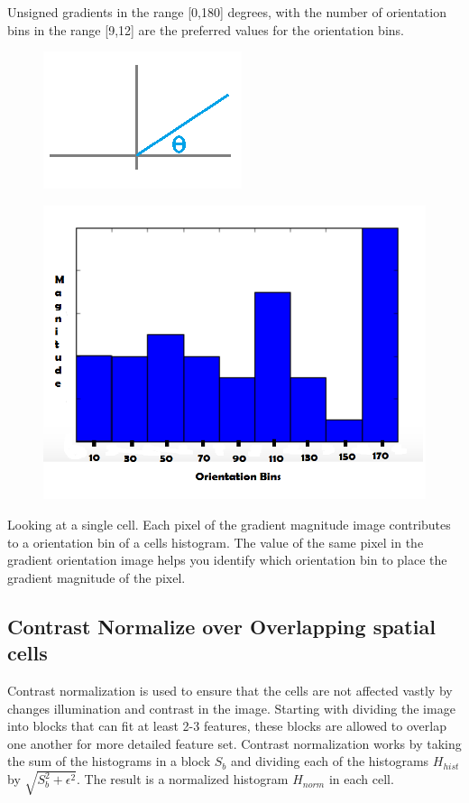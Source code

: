 Unsigned gradients in the range [0,180] degrees, with the number of orientation bins in the range [9,12] are the preferred values for the orientation bins.
\begin{figure}[H]
\centering
\begin{minipage}{.5\textwidth}
  \centering
  \includegraphics[width=.4\linewidth]{theta}
  \label{fig:test1}
\end{minipage}%
\begin{minipage}{.5\textwidth}
  \centering
  \includegraphics[width=.4\linewidth]{hist}
  \label{fig:test2}
\end{minipage}
\end{figure}
Looking at a single cell. Each pixel of the gradient magnitude image contributes to a orientation bin of a cells histogram. The value of the same pixel in the gradient orientation image helps you identify which orientation bin to place the gradient magnitude of the pixel.

\subsection{Contrast Normalize over Overlapping spatial cells}
Contrast normalization is used to ensure that the cells are not affected vastly by changes illumination and contrast in the image. Starting with dividing the image into blocks that can fit at least 2-3 features, these blocks are allowed to overlap one another for more detailed feature set. Contrast normalization works by taking the sum of the histograms in a block $S_b$ and dividing each of the histograms $H_{hist}$ by $\sqrt{S_b ^2 + \epsilon ^2}$. The result is a normalized histogram $H_{norm}$ in each cell. 


